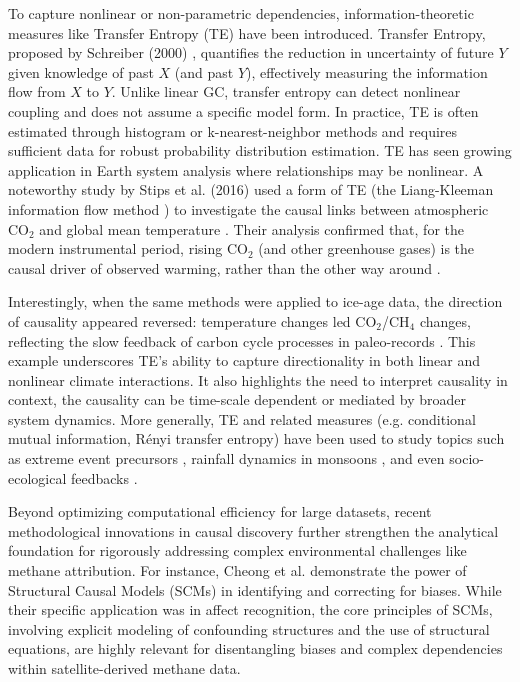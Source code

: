 To capture nonlinear or non-parametric dependencies, information-theoretic measures like Transfer Entropy (TE) have been introduced. Transfer Entropy, proposed by Schreiber (2000) \cite{Schreiber2000}, quantifies the reduction in uncertainty of future $Y$ given knowledge of past $X$ (and past $Y$), effectively measuring the information flow from $X$ to $Y$. Unlike linear GC, transfer entropy can detect nonlinear coupling and does not assume a specific model form. In practice, TE is often estimated through histogram or k-nearest-neighbor methods and requires sufficient data for robust probability distribution estimation. TE has seen growing application in Earth system analysis where relationships may be nonlinear. A noteworthy study by Stips et al. (2016) \cite{Stips2016} used a form of TE (the Liang-Kleeman information flow method \cite{LianKleeman2013}) to investigate the causal links between atmospheric CO$_2$ and global mean temperature \cite{Stips2016}. Their analysis confirmed that, for the modern instrumental period, rising CO$_2$ (and other greenhouse gases) is the causal driver of observed warming, rather than the other way around \cite{Larsson2023}.

Interestingly, when the same methods were applied to ice-age data, the direction of causality appeared reversed: temperature changes led CO$_2$/CH$_4$ changes, reflecting the slow feedback of carbon cycle processes in paleo-records \cite{Larsson2023}. This example underscores TE's ability to capture directionality in both linear and nonlinear climate interactions. It also highlights the need to interpret causality in context, the causality can be time-scale dependent or mediated by broader system dynamics. More generally, TE and related measures (e.g. conditional mutual information, Rényi transfer entropy) have been used to study topics such as extreme event precursors \cite{Palus2024, Benocci2025}, rainfall dynamics in monsoons \cite{tongal_forecasting_2021}, and even socio-ecological feedbacks \cite{li_integrating_2025}.

Beyond optimizing computational efficiency for large datasets, recent methodological innovations in causal discovery further strengthen the analytical foundation for rigorously addressing complex environmental challenges like methane attribution. For instance, Cheong et al. \cite{cheong2021causal} demonstrate the power of Structural Causal Models (SCMs) in identifying and correcting for biases. While their specific application was in affect recognition, the core principles of SCMs, involving explicit modeling of confounding structures and the use of structural equations, are highly relevant for disentangling biases and complex dependencies within satellite-derived methane data.


